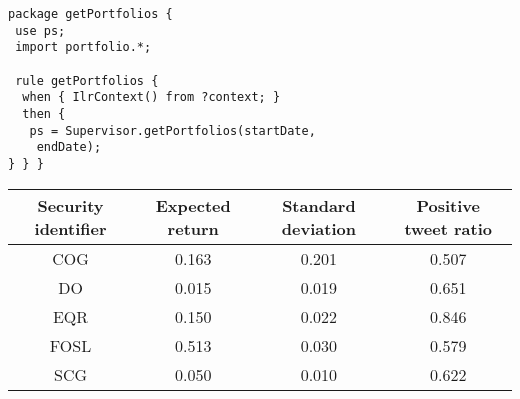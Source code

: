 \begin{multicols}{2}
{\noindent
  \begin{verbatim}
package getPortfolios {
 use ps;
 import portfolio.*;

 rule getPortfolios {
  when { IlrContext() from ?context; }
  then {
   ps = Supervisor.getPortfolios(startDate,
    endDate);
} } }
\end{verbatim}

\begin{table*}\small
\begin{center}
  \vspace*{2ex}

  \begin{tabular}{cccc}
  \hline
Security identifier&Expected return&Standard deviation&Positive tweet ratio\\
\hline
COG&0.163&0.201&0.507\\
DO&0.015&0.019&0.651\\
EQR&0.150&0.022&0.846\\
FOSL&0.513&0.030&0.579\\
SCG&0.050&0.010&0.622\\
\hline
\end{tabular}
\end{center}
\begin{center}
  \vspace*{2ex}


\end{center}
\end{table*}}
\end{multicols}
